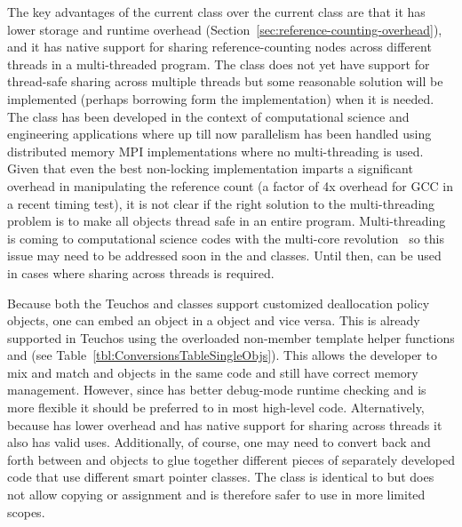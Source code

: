 \documentclass[pdf,ps2pdf,11pt]{SANDreport}
\begin{document}
The key advantages of the current {} class
over the current {} class are that it has lower storage and
runtime overhead (Section~\ref{sec:reference-counting-overhead}), and
it has native support for sharing reference-counting nodes across
different threads in a multi-threaded program.  The {} class
does not yet have support for thread-safe sharing across multiple
threads but some reasonable solution will be implemented (perhaps
borrowing form the {} implementation) when it
is needed.  The {} class has been developed in the context of
computational science and engineering applications where up till now
parallelism has been handled using distributed memory MPI
implementations where no multi-threading is used.  Given that even the
best non-locking {} implementation imparts a
significant overhead in manipulating the reference count (a factor of
4x overhead for GCC in a recent timing test), it is not clear if the
right solution to the multi-threading problem is to make all
{} objects thread safe in an entire program.  Multi-threading
is coming to computational science codes with the multi-core
revolution~\cite{DesignIssuesForMultiCore08} so this issue may need to
be addressed soon in the {} and {} classes.
Until then, {} can be used in cases where
sharing across threads is required.

Because both the Teuchos {} and {}
classes support customized deallocation policy objects, one can embed
an {} object in a {} object and vice
versa.  This is already supported in Teuchos using the overloaded
non-member template helper functions {} and {} (see Table~\ref{tbl:ConversionsTableSingleObjs}).  This
allows the developer to mix and match {} and
{} objects in the same code and still have
correct memory management.  However, since {} has better
debug-mode runtime checking and is more flexible it should be
preferred to {} in most high-level code.
Alternatively, because {} has lower overhead
and has native support for sharing across threads it also has valid
uses.  Additionally, of course, one may need to convert back and forth
between {} and {} objects to glue
together different pieces of separately developed code that use
different smart pointer classes.  The class {}
is identical to {} but does not allow copying or
assignment and is therefore safer to use in more limited scopes.
\end{document}
